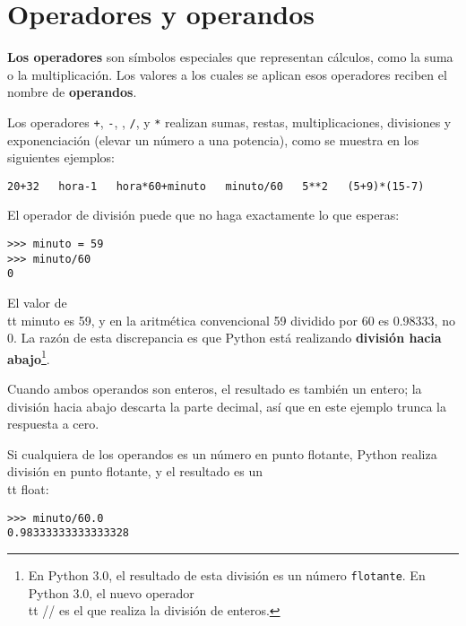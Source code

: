 \section{Operadores y operandos}

{\bf Los operadores} son símbolos especiales que representan cálculos, como
la suma o la multiplicación. Los valores a los cuales se aplican esos operadores
reciben el nombre de {\bf operandos}.

Los operadores {\tt +}, {\tt -}, {\tt *}, {\tt /}, y {\tt **}
realizan sumas, restas, multiplicaciones, divisiones y
exponenciación (elevar un número a una potencia), como se muestra en los siguientes ejemplos:

\beforeverb
\begin{verbatim}
20+32   hora-1   hora*60+minuto   minuto/60   5**2   (5+9)*(15-7)
\end{verbatim}
\afterverb
%
El operador de división puede que no haga exactamente lo que esperas:

\beforeverb
\begin{verbatim}
>>> minuto = 59
>>> minuto/60
0
\end{verbatim}
\afterverb
%
El valor de {\\tt minuto} es 59, y en la aritmética convencional 59
dividido por 60 es 0.98333, no 0. La razón de esta discrepancia es
que Python está realizando {\bf división hacia abajo}\footnote{En Python 3.0,
el resultado de esta división es un número {\tt flotante}.
En Python 3.0, el nuevo operador
{\\tt //} es el que realiza la división de enteros.}.


Cuando ambos operandos son enteros, el resultado es también un
entero; la división hacia abajo descarta la parte decimal,
así que en este ejemplo trunca la respuesta a cero.

Si cualquiera de los operandos es un número en punto flotante, Python realiza
división en punto flotante, y el resultado es un {\\tt float}:

\beforeverb
\begin{verbatim}
>>> minuto/60.0
0.98333333333333328
\end{verbatim}
\afterverb


